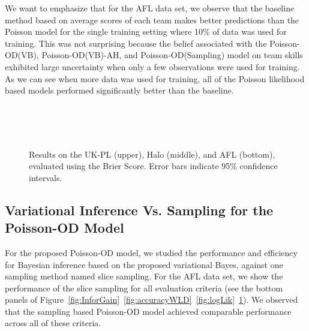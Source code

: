 We want to emphasize that for the AFL data set, we observe that the baseline method based on average scores of each team makes better predictions than the Poisson model for the single training setting where 10\% of data was used for training. This was not surprising because the belief associated with the Poisson-OD(VB), Poisson-OD(VB)-AH, and Poisson-OD(Sampling) model on team skills exhibited large uncertainty when only a few observations were used for training. As we can see when more data was used for training, all of the Poisson likelihood based models performed significantly better than the baseline. 

\begin{center}
\begin{figure}[htbp!]
 \centering
 \\
\\
\\
\caption{\small Results on the UK-PL (upper), Halo (middle), and AFL (bottom), evaluated
using the Brier Score. Error bars indicate
95\% confidence intervals.}
\label{fig:ScoreError}
\end{figure}
\end{center}

\subsection{Variational Inference Vs. Sampling for the Poisson-OD Model}
\label{sec:VBSampling}
For the proposed Poisson-OD model, we studied the performance and efficiency for Bayesian inference based on the proposed variational Bayes, against one sampling method named slice sampling. For the AFL data set, we show the performance of the slice sampling for all evaluation criteria (see the bottom panels of Figure~\ref{fig:InforGain}~\ref{fig:accuracyWLD}~\ref{fig:logLik}~\ref{fig:ScoreError}). We observed that the sampling based Poisson-OD model achieved comparable performance across all of these criteria. 


